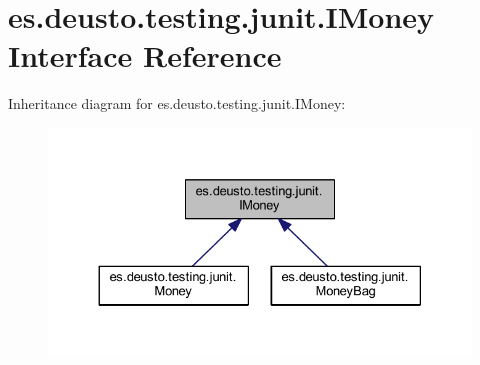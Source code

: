 \hypertarget{interfacees_1_1deusto_1_1testing_1_1junit_1_1_i_money}{}\section{es.\+deusto.\+testing.\+junit.\+I\+Money Interface Reference}
\label{interfacees_1_1deusto_1_1testing_1_1junit_1_1_i_money}


Inheritance diagram for es.\+deusto.\+testing.\+junit.\+I\+Money\+:\nopagebreak
\begin{figure}[H]
\begin{center}
\leavevmode
\includegraphics[width=330pt]{interfacees_1_1deusto_1_1testing_1_1junit_1_1_i_money__inherit__graph}
\end{center}
\end{figure}
